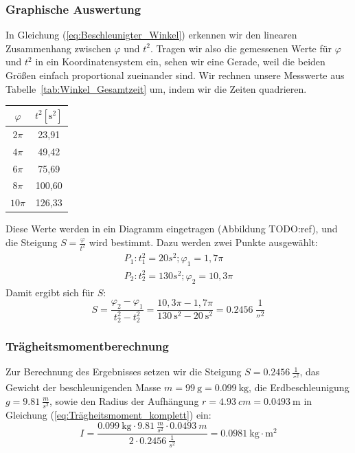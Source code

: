 \documentclass{article}
\begin{document}
			\subsubsection{Graphische Auswertung}
			In Gleichung (\ref{eq:Beschleunigter_Winkel}) erkennen wir den linearen Zusammenhang zwischen \( \varphi \) und \( t^2 \).
			Tragen wir also die gemessenen Werte für \( \varphi \) und \( t^2 \) in ein Koordinatensystem ein, sehen wir eine Gerade, weil die beiden Größen einfach proportional zueinander sind.
			Wir rechnen unsere Messwerte aus Tabelle~\ref{tab:Winkel_Gesamtzeit} um, indem wir die Zeiten quadrieren.
			\begin{center}
				\begin{tabular}{ | c | c | } 
					\hline
					\( \varphi \) & \(t^2 [\unit{\second^2}] \) \\
					\hline
					\( 2\pi \) & 23,91 \\
					\( 4\pi \) & 49,42 \\
					\( 6\pi \)  & 75,69 \\
					\( 8\pi \) & 100,60 \\
					\( 10\pi \) & 126,33 \\
					\hline
				\end{tabular}
			\end{center}
			Diese Werte werden in ein Diagramm eingetragen (Abbildung TODO:ref), und die Steigung \( S = \frac{\varphi}{t^2} \) wird bestimmt. Dazu werden zwei Punkte ausgewählt:
			\begin{equation}
				\begin{gathered}\label{eq:punkte}
					P_1: t^2_1 = 20s^2 ; \varphi_1 = 1,7 \pi \\
					P_2: t^2_2 = 130s^2 ; \varphi_2 = 10,3 \pi
				\end{gathered}
			\end{equation}
			Damit ergibt sich für \( S \):
			\begin{equation}
				S = \frac{ \varphi_2 - \varphi_1 }{ t^2_2 - t^2_2 } = \frac{ 10,3 \pi - 1,7 \pi }{ \SI{130}{\second^2} - \SI{20}{\second^2} } = \SI{0,2456}{\frac{1}{\second^2}}
			\end{equation}

			\subsubsection{Trägheitsmomentberechnung}
				Zur Berechnung des Ergebnisses setzen wir die Steigung \(S = \SI{0,2456}{\frac{1}{\second^2}} \), das Gewicht der beschleunigenden Masse \(m = \SI{99}{\gram} = \SI{0.099}{\kilogram}\), die Erdbeschleunigung
				\(g = \SI{9,81}{\frac{m}{s^2}} \), sowie den Radius der Aufhängung \(r = \SI{4.93}{cm} = \SI{0.0493}{\metre}\) in Gleichung (\ref{eq:Trägheitsmoment_komplett}) ein:
				\begin{equation}
					I = \frac{ \SI{0,099}{\kilogram} \cdot \SI{9,81}{\frac{m}{s^2}} \cdot \SI{0,0493}{m} }{ 2 \cdot \SI{0,2456}{\frac{1}{s^2}} } = \SI{0,0981}{\kilogram \cdot \metre^2}
				\end{equation}
			
\end{document}
